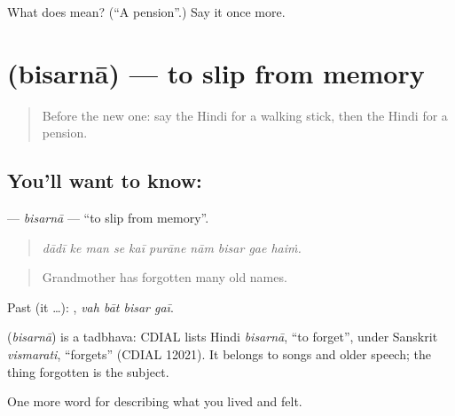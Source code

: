 \begin{tcolorbox}[breakable,colback=teal!4,colframe=teal!35!black,title={Before you move on}]
What does  mean? (\textquotedblleft{}A pension\textquotedblright{}.) Say it once more.
\end{tcolorbox}
\section[\texorpdfstring{\hi{बिसरना} (bisarnā)}{बिसरना (bisarnā)}]{ (bisarnā) — to slip from memory}

\label{lesson:HI-C504-bisarna}



\begin{quote}
Before the new one: say the Hindi for a walking stick, then the Hindi for a pension.
\end{quote}

\subsection*{You'll want to know: }
\textbf{} — \emph{bisarnā} — \textquotedblleft{}to slip from memory\textquotedblright{}.

\begin{quote}
         
\end{quote}

\begin{quote}
\emph{dādī ke man se kaī purāne nām bisar gae haiṁ.}
\end{quote}

\begin{quote}
Grandmother has forgotten many old names.
\end{quote}

Past (it …):    , \emph{vah bāt bisar gaī}.

\begin{cousinweb}
\textbf{} (\emph{bisarnā}) is a tadbhava: CDIAL lists Hindi \emph{bisarnā}, \textquotedblleft{}to forget\textquotedblright{}, under Sanskrit \emph{vismarati}, \textquotedblleft{}forgets\textquotedblright{} (CDIAL 12021). It belongs to songs and older speech; the thing forgotten is the subject.
\end{cousinweb}

\begin{grammarlens}[title={What you've built}]
One more word for describing what you lived and felt.
\end{grammarlens}

